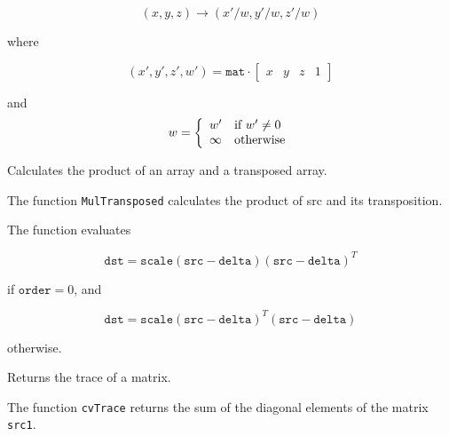 \[ (x, y, z) \rightarrow (x'/w, y'/w, z'/w) \]

where

\[
(x', y', z', w') = \texttt{mat} \cdot
\begin{bmatrix} x & y & z & 1 \end{bmatrix}
\]

and
\[ w = \left\{ \begin{array}{l l} w' & \mbox{if $w' \ne 0$}\\ \infty & \mbox{otherwise}\\ \end{array} \right. \]

\label{MulTransposed}

Calculates the product of an array and a transposed array.


\begin{description}
\end{description}

The function \texttt{MulTransposed} calculates the product of src and its transposition.

The function evaluates

\[
\texttt{dst}=\texttt{scale} (\texttt{src}-\texttt{delta}) (\texttt{src}-\texttt{delta})^T
\]

if $\texttt{order}=0$, and

\[
\texttt{dst}=\texttt{scale} (\texttt{src}-\texttt{delta})^T (\texttt{src}-\texttt{delta})
\]

otherwise.

\label{Trace}

Returns the trace of a matrix.


\begin{description}
\end{description}


The function \texttt{cvTrace} returns the sum of the diagonal elements of the matrix \texttt{src1}.

